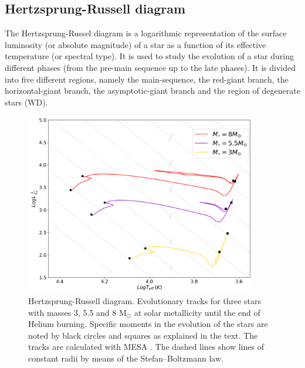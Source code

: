 \subsection{Hertzsprung-Russell diagram}\label{sub:HR_diagram}

The Hertzsprung-Russel diagram is a logarithmic representation of the surface luminosity (or absolute magnitude) of a star as a function of its effective temperature (or spectral type). It is used to study the evolution of a star during different phases (from the pre-main sequence up to the late phases). It is divided into five different regions, namely the main-sequence, the red-giant branch, the horizontal-giant branch, the asymptotic-giant branch and the region of degenerate stars (WD). 
\begin{figure}[H]
    \centering
    \includegraphics[width=0.9\textwidth]{Thesis/graphs/HR_inter_stars.pdf}
    \caption{Hertzsprung-Russell diagram. Evolutionary tracks for three stars with masses 3, 5.5 and 8 M$_{\odot}$ at solar metallicity until the end of Helium burning. Specific moments in the evolution of the stars are noted by black circles and squares as explained in the text. The tracks are calculated with MESA \citep{paxton2010modules,paxton2013modules,paxton2015modules,paxton2019modules}. The dashed lines show lines of constant radii by means of the Stefan–Boltzmann law.}
    \label{fig:HR_inter_stars}
\end{figure}
